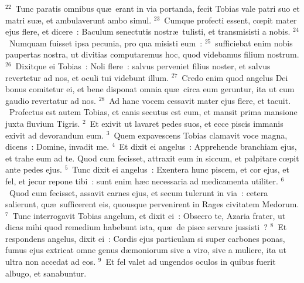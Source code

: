 ${}^{22}$~Tunc paratis omnibus qu\ae\ erant in via portanda, fecit Tobias vale patri suo et matri su\ae , et ambulaverunt ambo simul.
${}^{23}$~Cumque profecti essent, cœpit mater ejus flere, et dicere~: Baculum senectutis nostr\ae\ tulisti, et transmisisti a nobis.
${}^{24}$~Numquam fuisset ipsa pecunia, pro qua misisti eum~:
${}^{25}$~sufficiebat enim nobis paupertas nostra, ut divitias computaremus hoc, quod videbamus filium nostrum.
${}^{26}$~Dixitque ei Tobias~: Noli flere~: salvus perveniet filius noster, et salvus revertetur ad nos, et oculi tui videbunt illum.
${}^{27}$~Credo enim quod angelus Dei bonus comitetur ei, et bene disponat omnia qu\ae\ circa eum geruntur, ita ut cum gaudio revertatur ad nos.
${}^{28}$~Ad hanc vocem cessavit mater ejus flere, et tacuit.
~Profectus est autem Tobias, et canis secutus est eum, et mansit prima mansione juxta fluvium Tigris.
${}^{2}$~Et exivit ut lavaret pedes suos, et ecce piscis immanis exivit ad devorandum eum.
${}^{3}$~Quem expavescens Tobias clamavit voce magna, dicens~: Domine, invadit me.
${}^{4}$~Et dixit ei angelus~: Apprehende branchiam ejus, et trahe eum ad te. Quod cum fecisset, attraxit eum in siccum, et palpitare cœpit ante pedes ejus.
${}^{5}$~Tunc dixit ei angelus~: Exentera hunc piscem, et cor ejus, et fel, et jecur repone tibi~: sunt enim h\ae c necessaria ad medicamenta utiliter.
${}^{6}$~Quod cum fecisset, assavit carnes ejus, et secum tulerunt in via~: cetera salierunt, qu\ae\ sufficerent eis, quousque pervenirent in Rages civitatem Medorum.
${}^{7}$~Tunc interrogavit Tobias angelum, et dixit ei~: Obsecro te, Azaria frater, ut dicas mihi quod remedium habebunt ista, qu\ae\ de pisce servare jussisti~?
${}^{8}$~Et respondens angelus, dixit ei~: Cordis ejus particulam si super carbones ponas, fumus ejus extricat omne genus d\ae moniorum sive a viro, sive a muliere, ita ut ultra non accedat ad eos.
${}^{9}$~Et fel valet ad ungendos oculos in quibus fuerit albugo, et sanabuntur.


